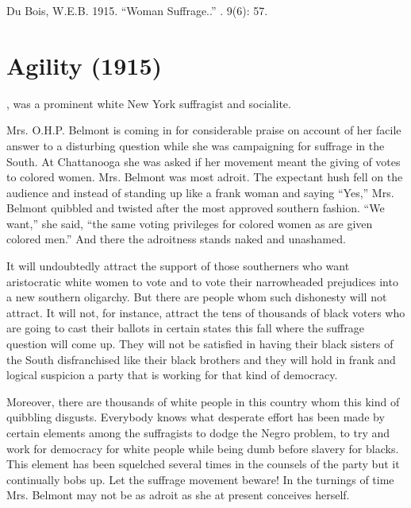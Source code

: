 \documentclass[letterpaper,10pt,english]{jupyterBook}
\begin{document}
\sphinxAtStartPar
{} Du Bois, W.E.B. 1915. “Woman Suffrage..” . 9(6): 57.


\section{Agility (1915)}
\label{\detokenize{Volumes/09/03/agility:agility-1915}}\label{\detokenize{Volumes/09/03/agility::doc}}
\begin{sphinxShadowBox}
\sphinxstylesidebartitle{}

\sphinxAtStartPar
{}, was a prominent white New York suffragist and socialite.
\end{sphinxShadowBox}

\sphinxAtStartPar
Mrs. O.H.P. Belmont is coming in for considerable praise on account of her facile answer to a disturbing question while she was campaigning for suffrage in the South. At Chattanooga she was asked if her movement meant the giving of votes to colored women. Mrs. Belmont was most adroit. The expectant hush fell on the audience and instead of standing up like a frank woman and saying “Yes,” Mrs. Belmont quibbled and twisted after the most approved southern fashion. “We want,” she said, “the same voting privileges for colored women as are given colored men.” And there the adroitness stands naked and unashamed.

\sphinxAtStartPar
It will undoubtedly attract the support of those southerners who want aristocratic white women to vote and to vote their narrow\sphinxhyphen{}headed prejudices into a new southern oligarchy. But there are people whom such dishonesty will not attract. It will not, for instance, attract the tens of thousands of black voters who are going to cast their ballots in certain states this fall where the suffrage question will come up. They will not be satisfied in having their black sisters of the South disfranchised like their black brothers and they will hold in frank and logical suspicion a party that is working for that kind of democracy.

\sphinxAtStartPar
Moreover, there are thousands of white people in this country whom this kind of quibbling disgusts. Everybody knows what desperate effort has been made by certain elements among the suffragists to dodge the Negro problem, to try and work for democracy for white people while being dumb before slavery for blacks. This element has been squelched several times in the counsels of the party but it continually bobs up. Let the suffrage movement beware! In the turnings of time Mrs. Belmont may not be as adroit as she at present con­ceives herself.
\end{document}
